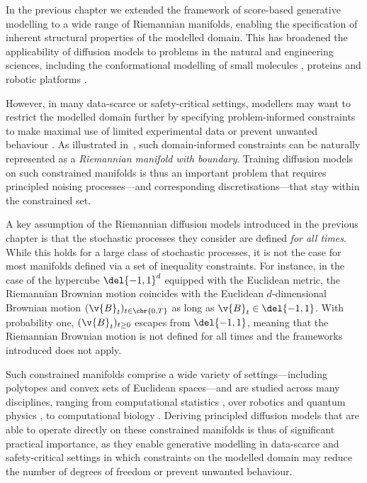In the previous chapter we extended the framework of score-based generative modelling to a wide range of Riemannian manifolds, enabling the specification of inherent structural properties of the modelled domain.
This has broadened the applicability of diffusion models to problems in the natural and engineering sciences, including the conformational modelling of small molecules \parencite{jing2022torsional, corso2023diffdock}, proteins \parencite{trippe2022Diffusion,watson2022Broadly,yim2023se} and robotic platforms \parencite{urain2022se}.

However, in many data-scarce or safety-critical settings, modellers may want to restrict the modelled domain further by specifying problem-informed constraints to make maximal use of limited experimental data or prevent unwanted behaviour \parencite{Morris2002,han2006inverse,Thiele2013,lukens2020practical}.
As illustrated in~, such domain-informed constraints can be naturally represented as a \emph{Riemannian manifold with boundary}.
Training diffusion models on such constrained manifolds is thus an important problem that requires principled noising processes---and corresponding discretisations---that stay within the constrained set.

A key assumption of the Riemannian diffusion models introduced in the previous chapter is that the stochastic processes they consider are defined \emph{for all times}.
While this holds for a large class of stochastic processes, it is not the case for most manifolds defined via a set of inequality constraints.
For instance, in the case of the hypercube \(\del{-1,1}^d\) equipped with the Euclidean metric, the Riemannian Brownian motion coincides with the Euclidean \(d\)-dimensional Brownian motion \((\v{B}_t)_{t \in \cbr{0,T}}\) as long as \(\v{B}_t \in \del{-1,1}\).
With probability one, \((\v{B}_t)_{t \geq 0}\) escapes from \(\del{-1,1}\), meaning that the Riemannian Brownian motion is not defined for all times and the frameworks introduced does not apply.

Such constrained manifolds comprise a wide variety of settings---including polytopes and convex sets of Euclidean spaces---and are studied across many disciplines, ranging from computational statistics \parencite{Morris2002}, over robotics \parencite{han2006inverse} and quantum physics \parencite{lukens2020practical}, to computational biology \parencite{Thiele2013}.
Deriving principled diffusion models that are able to operate directly on these constrained manifolds is thus of significant practical importance, as they enable generative modelling in data-scarce and safety-critical settings in which constraints on the modelled domain may reduce the number of degrees of freedom or prevent unwanted behaviour.

